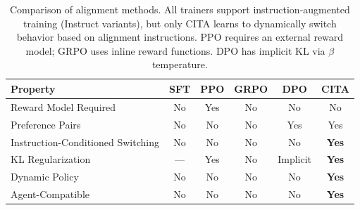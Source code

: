 \vspace{-2mm}
\begin{table}[H]
\centering
\footnotesize
\begin{tabularx}{\columnwidth}{@{}Xccccc@{}}
\toprule
\textbf{Property} & \textbf{SFT} & \textbf{PPO} & \textbf{GRPO} & \textbf{DPO} & \textbf{CITA} \\
\midrule
Reward Model Required & No & Yes & No & No & No \\
\hline
Preference Pairs & No & No & No & Yes & Yes \\
\hline
Instruction-Conditioned Switching & No & No & No & No & \textbf{Yes} \\
\hline
KL Regularization & --- & Yes & No & Implicit & \textbf{Yes} \\
\hline
Dynamic Policy & No & No & No & No & \textbf{Yes} \\
\hline
Agent-Compatible & No & No & No & No & \textbf{Yes} \\
\bottomrule
\end{tabularx}
\caption{Comparison of alignment methods. All trainers support instruction-augmented training (Instruct variants), but only CITA learns to dynamically switch behavior based on alignment instructions. PPO requires an external reward model; GRPO uses inline reward functions. DPO has implicit KL via $\beta$ temperature.}
\label{tab:method_comparison}
\vspace{-4mm}
\end{table}


















